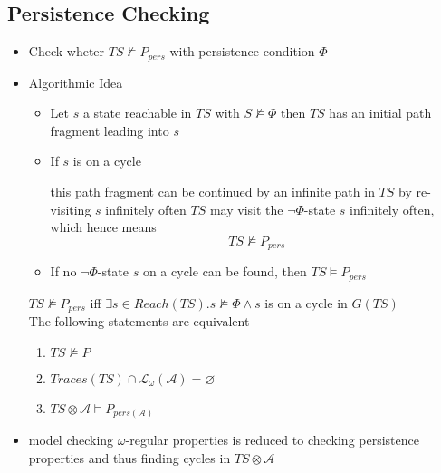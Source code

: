 \documentclass[a4paper, 10pt]{article}
\begin{document}
\subsection*{Persistence Checking}
\begin{itemize}
    \item Check wheter $TS\not\models P_{pers}$ with persistence condition $\Phi$
    \item Algorithmic Idea
    \begin{itemize}
        \item Let $s$ a state reachable in $TS$ with $S\not\models\Phi$ \follows then $TS$ has an initial path fragment leading into $s$
        \item If $s$ is on a cycle
        \begin{itemize}
            \fitem this path fragment can be continued by an infinite path in $TS$ by re-visiting $s$ infinitely often
            \fitem $TS$ may visit the $\neg\Phi$-state $s$ infinitely often, which hence means \[ TS\not\models P_{pers} \]
        \end{itemize}
        \item If no $\neg\Phi$-state $s$ on a cycle can be found, then $TS\models P_{pers}$
    \end{itemize}
    \begin{shaded}
        $TS\not\models P_{pers}$ iff $\exists s\in Reach(TS).s\not\models\Phi\wedge s$ is on a cycle in $G(TS)$
        \\ The following statements are equivalent
        \begin{enumerate}
            \item $TS\not\models P$
            \item $Traces(TS)\cap \mathcal{L}_\omega(\mathcal{A})=\varnothing$
            \item $TS\otimes \mathcal{A}\models P_{pers(\mathcal{A})}$
        \end{enumerate}
    \end{shaded}
    \item model checking $\omega$-regular properties is reduced to checking persistence properties and thus finding cycles in $TS\otimes \mathcal{A}$
\end{itemize}
\end{document}

